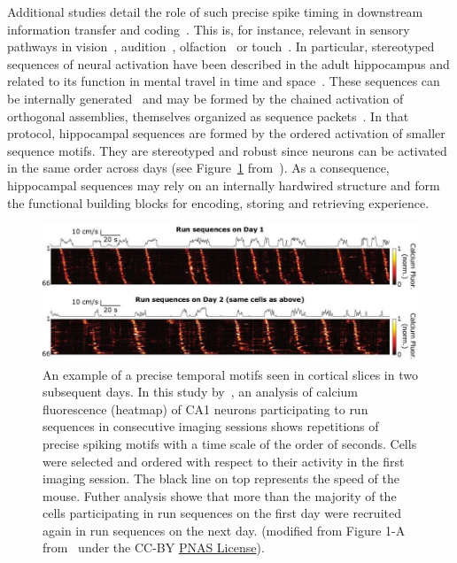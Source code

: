 \documentclass[brainsci, %
               review,accept,pdftex,moreauthors
               ]{Definitions/mdpi}
\begin{document}
Additional studies detail the role of such precise spike timing in downstream information transfer and coding~\citep{villette_internally_2015,branco_dendritic_2010,luczak_packet-based_2015}. This is, for instance, relevant in sensory pathways in vision~\citep{meister_concerted_1995}, audition~\citep{decharms_primary_1996}, olfaction~\citep{cleland_construction_2014, kashiwadani_synchronized_1999, rinberg_speed-accuracy_2006} or touch~\citep{johansson_first_2004}.  In particular, stereotyped sequences of neural activation have been described in the adult hippocampus and related to its function in mental travel in time and space~\citep{buzsaki_space_2018}. These sequences can be internally generated~\citep{pastalkova_internally_2008,villette_internally_2015} and may be formed by the chained activation of orthogonal assemblies, themselves organized as sequence packets~\citep{malvache_awake_2016}. In that protocol, hippocampal sequences are formed by the ordered activation of smaller sequence motifs. They are stereotyped and robust since neurons can be activated in the same order across days (see Figure~\ref{fig:haimerl} from~\citep{haimerl_internal_2019}). As a consequence, hippocampal sequences may rely on an internally hardwired structure and form the functional building blocks for encoding, storing and retrieving experience.
%
\begin{figure}[H]
\includegraphics[width=0.98\linewidth]{figures/haimerl2019.jpg}
\caption{
        An example of a precise temporal motifs seen in cortical slices in two subsequent days. 
        In this study by~\citep{haimerl_internal_2019}, an analysis of calcium fluorescence (heatmap) of CA1 neurons participating to run sequences in consecutive imaging sessions shows repetitions of precise spiking motifs with a time scale of the order of seconds. Cells were selected and ordered with respect to their activity in the first imaging session. The black line on top represents the speed of the mouse. Futher analysis showe that more than the majority of the cells participating in run sequences on the first day were recruited again in run sequences on the next day. (modified from Figure 1-A from~\citep{haimerl_internal_2019} under the CC-BY \href{https://www.pnas.org/doi/full/10.1073/pnas.1718518116}{PNAS License}).}\label{fig:haimerl}  %

\end{figure}
\end{document}
